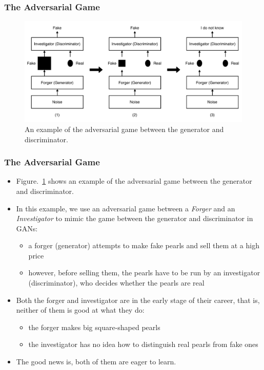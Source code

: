 \documentclass{beamer}
\begin{document}
\begin{frame}
\setlength{\leftmargini}{0.3cm}
\setlength{\leftmarginii}{0.6cm}
\setlength{\leftmarginiii}{0.9cm}
\frametitle{The Adversarial Game}
\begin{figure}[h!]
\centering
\includegraphics[width=1.0\textwidth]{./figure/gans}
\caption{\footnotesize{An example of the adversarial game between the generator and discriminator.}}\label{fig:gans}
\end{figure}
\end{frame}

\begin{frame}
\setlength{\leftmargini}{0.3cm}
\setlength{\leftmarginii}{0.6cm}
\setlength{\leftmarginiii}{0.9cm}
\frametitle{The Adversarial Game}
\begin{itemize}
\item Figure.~\ref{fig:gans} shows an example of the adversarial game between the generator and discriminator.
\item In this example, we use an adversarial game between a \emph{Forger} and an \emph{Investigator} to mimic the game between the generator and discriminator in GANs:
	\begin{itemize}
	\item a forger (generator) attempts to make fake pearls and sell them at a high price
	\item however, before selling them, the pearls have to be run by an investigator (discriminator), who decides whether the pearls are real
	\end{itemize}
\item Both the forger and investigator are in the early stage of their career, that is, neither of them is good at what they do:
	\begin{itemize}
	\item the forger makes big square-shaped pearls
	\item the investigator has no idea how to distinguish real pearls from fake ones
	\end{itemize}
\item The good news is, both of them are eager to learn. 
\end{itemize}
\end{frame}
\end{document}

